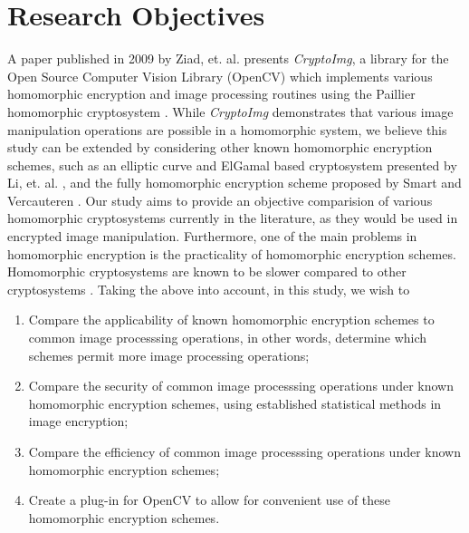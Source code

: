 \section{Research Objectives}

A paper published in 2009 by Ziad, et. al. presents \textit{CryptoImg}, a library for the  Open Source Computer Vision Library (OpenCV) which implements various homomorphic encryption and image processing routines using the Paillier homomorphic cryptosystem \cite{ziad_cryptoimg:_2016}. While \textit{CryptoImg} demonstrates that various image manipulation operations are possible in a homomorphic system, we believe this study can be extended by considering other known homomorphic encryption schemes, such as an elliptic curve and ElGamal based cryptosystem presented by Li, et. al. \cite{li_elliptic_2012}, and the fully homomorphic encryption scheme proposed by Smart and Vercauteren \cite{hutchison_fully_2010}. Our study aims to provide an objective comparision of various homomorphic cryptosystems currently in the literature, as they would be used in encrypted image manipulation.
Furthermore, one of the main problems in homomorphic encryption is the practicality of homomorphic encryption schemes. Homomorphic cryptosystems are known to be slower compared to other cryptosystems \cite{sen_homomorphic_2013}.
Taking the above into account, in this study, we wish to
\begin{enumerate}
    \item Compare the applicability of known homomorphic encryption schemes to common image processsing operations, in other words, determine which schemes permit more image processing operations;
		\item Compare the security of common image processsing operations under known homomorphic encryption schemes, using established statistical methods in image encryption;
    \item Compare the efficiency of common image processsing operations under known homomorphic encryption schemes;
    \item Create a plug-in for OpenCV to allow for convenient use of these homomorphic encryption schemes.
\end{enumerate}
